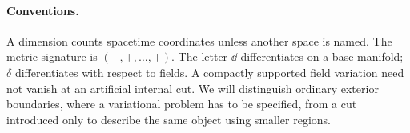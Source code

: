 \paragraph{Conventions.} A dimension counts spacetime coordinates unless another space is named. The metric signature is $(-,+,\ldots,+)$. The letter $\dd$ differentiates on a base manifold; $\delta$ differentiates with respect to fields. A compactly supported field variation need not vanish at an artificial internal cut. We will distinguish ordinary exterior boundaries, where a variational problem has to be specified, from a cut introduced only to describe the same object using smaller regions.
